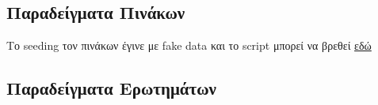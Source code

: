 \documentclass[../main.tex]{subfiles}
\begin{document}
\subsection{Παραδείγματα Πινάκων}

Το seeding τον πινάκων έγινε με fake data και το script μπορεί να βρεθεί
\href{https://github.com/johnstef99/GoT-db-auth/blob/master/laravel/got-db/database/seeders/DatabaseSeeder.php}{εδώ}



\subsection{Παραδείγματα Ερωτημάτων}

\end{document}
